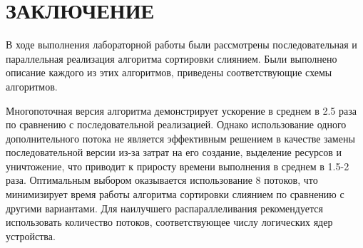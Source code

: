 \part*{ЗАКЛЮЧЕНИЕ}

В ходе выполнения лабораторной работы были рассмотрены последовательная и параллельная реализация алгоритма сортировки слиянием. Были выполнено описание каждого из этих алгоритмов, приведены соответствующие схемы алгоритмов. 

Многопоточная версия алгоритма демонстрирует ускорение в среднем в 2.5 раза по сравнению с последовательной реализацией. Однако использование одного дополнительного потока не является эффективным решением в качестве замены последовательной версии из-за затрат на его создание, выделение ресурсов и уничтожение, что приводит к приросту времени выполнения в среднем в 1.5-2 раза. Оптимальным выбором оказывается использование 8 потоков, что минимизирует время работы алгоритма сортировки слиянием по сравнению с другими вариантами. Для наилучшего распараллеливания рекомендуется использовать количество потоков, соответствующее числу логических ядер устройства.